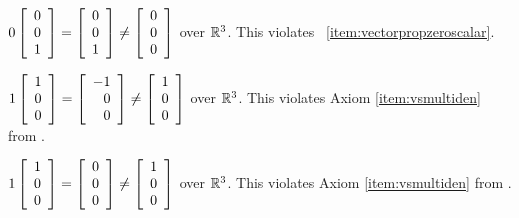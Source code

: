 \begin{enumerate}[!HW!, start=1]
\itemspade $0\vr{0\\0\\1} = \vr{0\\0\\1} \neq \vr{0\\0\\0}$ over $\R^3$. This violates \ \ref{item:vectorpropzeroscalar}.

\itemspade $1\vr{1\\0\\0} = \vr{-1\\0\\0} \neq \vr{1\\0\\0}$ over $\R^3$. This violates Axiom \ref{item:vsmultiden} from .

\itemspade $1\vr{1\\0\\0} = \vr{0\\0\\0} \neq \vr{1\\0\\0}$ over $\R^3$. This violates Axiom \ref{item:vsmultiden} from .
\end{enumerate}

\vspace{-15 pt}